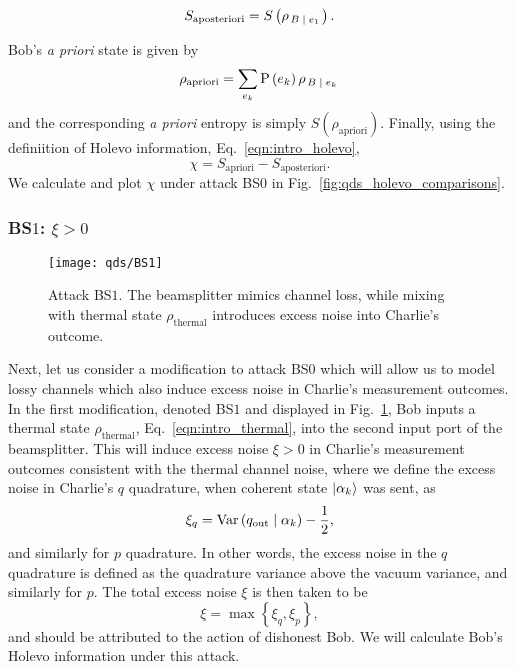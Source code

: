 \begin{equation}\label{eqn:aposteriori_entropy}
S_{\text{aposteriori}} = S\left(\rho_{\left. B \; \middle| \; e_1\right.}\right).
\end{equation}

\noindent Bob's \emph{a priori} state is given by
\begin{equation}\label{eqn:qds_aprioristate}
\rho_{\text{apriori}} = \sum_{e_k} \text{P}\left(e_k\right) \rho_{\left. B \; \middle| \; e_k\right.}
\end{equation}
and the corresponding \emph{a priori} entropy is simply $S\left(\rho_{\text{apriori}}\right)$. Finally, using the definiition of Holevo information, Eq.~\ref{eqn:intro_holevo},
\begin{equation}\label{eqn:qds_deriv_holevo}
\chi = S_{\text{apriori}} - S_{\text{aposteriori}}.
\end{equation}
We calculate and plot $\chi$ under attack BS$0$ in Fig.~\ref{fig:qds_holevo_comparisons}. 

\subsubsection{BS$1$: $\xi > 0$}\label{sec:qds_bs1}
\begin{figure}[htp]
\centering
\texttt{[image: qds/BS1]}
\caption{\label{fig:bs1_attack} Attack BS$1$. The beamsplitter mimics channel loss, while mixing with thermal state $\rho_{\text{thermal}}$ introduces excess noise into Charlie's outcome.}
\end{figure}
Next, let us consider a modification to attack BS$0$ which will allow us to model lossy channels which also induce excess noise in Charlie's measurement outcomes. In the first modification, denoted BS$1$ and displayed in Fig.~\ref{fig:bs1_attack}, Bob inputs a thermal state $\rho_{\text{thermal}}$, Eq.~\ref{eqn:intro_thermal}, into the second input port of the beamsplitter. This will induce excess noise $\xi > 0$ in Charlie's measurement outcomes consistent with the thermal channel noise,
where we define the excess noise in Charlie's $q$ quadrature, when coherent state $\ket{\alpha_k}$ was sent, as
\begin{equation}
\xi_q = \text{Var}\left(q_{\text{out}} \; \middle| \; \alpha_k\right) - \frac{1}{2},
\end{equation}
and similarly for $p$ quadrature. In other words, the excess noise in the $q$ quadrature is defined as the quadrature variance above the vacuum variance, and similarly for $p$. The total excess noise $\xi$ is then taken to be
\begin{equation}
\xi = \max \left\{ \xi_q, \xi_p\right\},
\end{equation}
and should be attributed to the action of dishonest Bob. We will calculate Bob's Holevo information under this attack.

